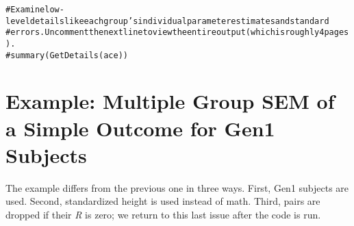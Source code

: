 \documentclass[letterpaper]{article}\usepackage{graphicx, color}
\makeatletter
\newcommand{\hlcomment}[1]{\textcolor[rgb]{0.180392156862745,0.6,0.341176470588235}{#1}}%
\newenvironment{kframe}{%
 \def\at@end@of@kframe{}%
 \ifinner\ifhmode%
  \def\at@end@of@kframe{\end{minipage}}%
  \begin{minipage}{\columnwidth}%
 \fi\fi%
 \def\FrameCommand##1{\hskip\@totalleftmargin \hskip-\fboxsep
 \colorbox{shadecolor}{##1}\hskip-\fboxsep
     \hskip-\linewidth \hskip-\@totalleftmargin \hskip\columnwidth}%
 \MakeFramed {\advance\hsize-\width
   \@totalleftmargin\z@ \linewidth\hsize
   \@setminipage}}%
 {\par\unskip\endMakeFramed%
 \at@end@of@kframe}
\newenvironment{knitrout}{}{} %
\makeatother
\begin{document}
\begin{knitrout}
\begin{kframe}
\begin{alltt}
\hlcomment{#Examine low-level details like each group's individual parameter estimates and standard}
\hlcomment{#  errors.  Uncomment the next line to view the entire output (which is roughly 4 pages).}
\hlcomment{#summary(GetDetails(ace))}
\end{alltt}
\end{kframe}
\end{knitrout}


\section{Example: Multiple Group SEM of a Simple Outcome for Gen1 Subjects}
The example differs from the previous one in three ways.  First, Gen1 subjects are used.  Second, standardized height is used instead of math.  Third, pairs are dropped if their \emph{R} is zero; we return to this last issue after the code is run.
\end{document}
